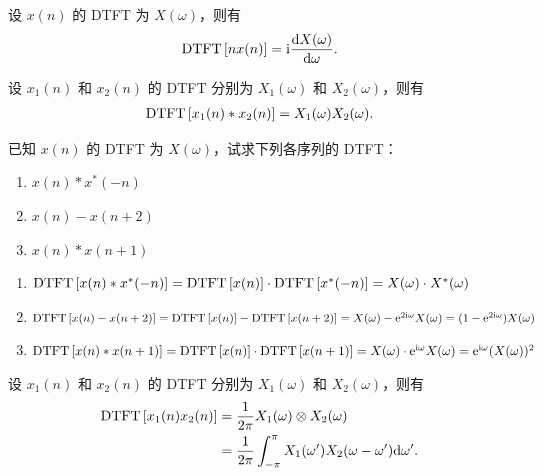 \begin{property}
    设 $x(n)$ 的 DTFT 为 $X(\omega)$，则有
    \begin{align*}
        \mathrm{DTFT}\left[n x(n)\right] = \mathrm{i}\frac{\mathrm{d}X(\omega)}{\mathrm{d}\omega}.
    \end{align*}
\end{property}

\begin{property}
    设 $x_1(n)$ 和 $x_2(n)$ 的 DTFT 分别为 $X_1(\omega)$ 和 $X_2(\omega)$，则有
    \begin{align*}
        \mathrm{DTFT}\left[x_1(n) * x_2(n)\right] = X_1(\omega)X_2(\omega).
    \end{align*}
\end{property}

\begin{exercise}
    已知 $x(n)$ 的 DTFT 为 $X(\omega)$，试求下列各序列的 DTFT：
    \begin{enumerate}[label=(\arabic*)]
        \item $x(n) * x^*(-n)$
        \item $x(n) - x(n + 2)$
        \item $x(n) * x(n + 1)$
    \end{enumerate}
\end{exercise}

\begin{solution}
    \begin{enumerate}[label=(\arabic*)]
        \item $\mathrm{DTFT}\left[x(n) * x^*(-n)\right] = \mathrm{DTFT}\left[x(n)\right] \cdot \mathrm{DTFT}\left[x^*(-n)\right]
            = X(\omega) \cdot X^*(\omega)$
        \item $\mathrm{DTFT}\left[x(n) - x(n + 2)\right] = \mathrm{DTFT}\left[x(n)\right] - \mathrm{DTFT}\left[x(n + 2)\right]
            = X(\omega) - \mathrm{e}^{2\mathrm{i}\omega}X(\omega)
            = (1 - \mathrm{e}^{2\mathrm{i}\omega})X(\omega)$
        \item $\mathrm{DTFT}\left[x(n) * x(n + 1)\right] = \mathrm{DTFT}\left[x(n)\right] \cdot \mathrm{DTFT}\left[x(n + 1)\right]
            = X(\omega) \cdot \mathrm{e}^{\mathrm{i}\omega}X(\omega)
            = \mathrm{e}^{\mathrm{i}\omega}(X(\omega))^2$
    \end{enumerate}
\end{solution}

\begin{property}
    设 $x_1(n)$ 和 $x_2(n)$ 的 DTFT 分别为 $X_1(\omega)$ 和 $X_2(\omega)$，则有
    \begin{align*}
        \mathrm{DTFT}\left[x_1(n)x_2(n)\right] & = \frac{1}{2\pi}X_1(\omega) \otimes X_2(\omega) \\
        & = \frac{1}{2\pi}\int_{-\pi}^{\pi}X_1(\omega')X_2(\omega - \omega')\mathrm{d}\omega'.
    \end{align*}
\end{property}

